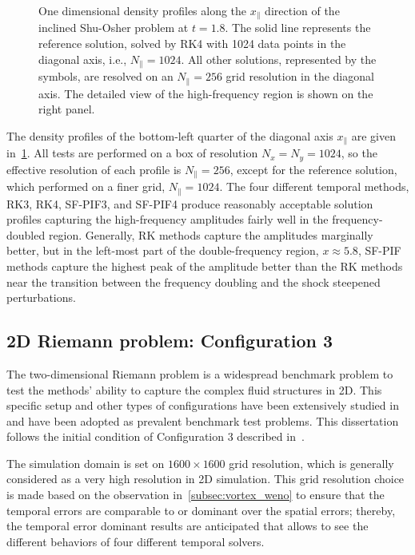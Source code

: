 \begin{figure}
\begin{subfigure}{\textwidth}
    \end{subfigure}
    \caption{One dimensional density profiles along the \( x_{\parallel} \) direction 
        of the inclined Shu-Osher problem at \( t = 1.8 \).
        The solid line represents the reference solution,
        solved by RK4 with 1024 data points
        in the diagonal axis, i.e., \( N_{\parallel} = 1024 \).
        All other solutions, represented by the symbols, are resolved on an
        \( N_{\parallel} = 256 \) grid resolution in the diagonal axis.
        The detailed view of the high-frequency region is shown
        on the right panel.
    }\label{fig:shu45}
\end{figure}

The density profiles of the bottom-left quarter of the diagonal axis \( x_{\parallel} \)
are given in~\cref{fig:shu45}. All tests are performed on a box of resolution \( N_{x} = N_{y} = 1024 \),
so the effective resolution of each profile is \( N_{\parallel} = 256 \),
except for the reference solution, which performed on a finer grid, \( N_{\parallel} = 1024 \).
The four different temporal methods, RK3, RK4, SF-PIF3, and SF-PIF4 produce
reasonably acceptable solution profiles capturing the high-frequency amplitudes
fairly well in the frequency-doubled region.
Generally, RK methods capture the amplitudes marginally better,
but in the left-most part of the double-frequency region, \( x \approx 5.8 \),
SF-PIF methods capture the highest peak of the amplitude better than
the RK methods near the transition between the frequency 
doubling and the shock steepened perturbations.




\subsection{2D Riemann problem: Configuration 3}\label{subsec:2drp_c3_weno}

The two-dimensional Riemann problem is a widespread benchmark problem to test
the methods' ability to capture the complex fluid structures in 2D.
This specific setup and other types of configurations have been
extensively studied in~\cite{zhang1990conjecture, schulz1993classification, schulz1993numerical}
and have been adopted as prevalent benchmark test problems.
This dissertation follows the initial condition of Configuration 3
described in~\cite{don2016hybrid,lee2017piecewise,lee2021single,lee2021recursive}.

The simulation domain is set on \( 1600 \times 1600 \) grid resolution,
which is generally considered as a very high resolution in 2D simulation.
This grid resolution choice is made based on the observation in~\cref{subsec:vortex_weno}
to ensure that the temporal errors are comparable to or dominant over the spatial errors;
thereby, the temporal error dominant results are anticipated that allows
to see the different behaviors of four different temporal solvers.

